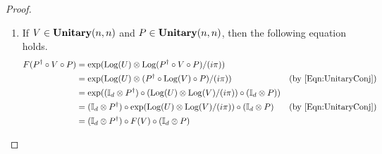 \begin{proof}
\begin{enumerate}
\begin{align*}
              \\
              &=
              \exp( \Log( U ) \otimes \Log( U ) \otimes H / (i\pi)^2 )
              &
              ( \text{by Thm.~\ref{Thm:ControlAssoc}} )
              \\
              &=
              \exp( ( \sigma_{d,d} \cdot ( \Log( U ) \otimes \Log( U ) ) \cdot \sigma_{d,d} ) \otimes H / (i\pi)^2 )
              \\
              &=
              \exp( ( \sigma_{d,d} \otimes \mathbb{I}_n ) \cdot ( \Log( U ) \otimes \Log( U ) \otimes H / (i\pi)^2 ) \cdot ( \sigma_{d,d} \otimes \mathbb{I}_n ) )
              \\
              &=
              ( \sigma_{d,d} \otimes \mathbb{I}_n ) \cdot \exp( \Log( U ) \otimes \Log( U ) \otimes H / (i\pi)^2 ) \cdot ( \sigma_{d,d} \otimes \mathbb{I}_n )
              &
              ( \text{by~\cref{Eqn:UnitaryConj}} )
              \\
              &=
              ( \sigma_{d,d} \otimes \mathbb{I}_n ) \cdot ( U \odot ( U \odot V ) ) \cdot ( \sigma_{d,d} \otimes \mathbb{I}_n )
              &
              ( \text{by Thm.~\ref{Thm:ControlAssoc}} )
              \\
              &=
              ( \sigma_{d,d} \otimes \mathbb{I}_n ) \cdot F( F( V ) ) \cdot ( \sigma_{d,d} \otimes \mathbb{I}_n )
          \end{align*}
          Then $F( F( V ) ) = ( \sigma_{d,d} \otimes \mathbb{I}_n ) \cdot F( F( V ) ) \cdot ( \sigma_{d,d} \otimes \mathbb{I}_n )$.
          Since $\sigma_{d,d} \otimes \mathbb{I}_n$ is also self-adjoint, then $( \sigma_{d,d} \otimes \mathbb{I}_n ) \cdot F( F( V ) ) = F( F( V ) ) \cdot ( \sigma_{d,d} \otimes \mathbb{I}_n )$.
    \item If $V \in \mathbf{Unitary}( n, n )$ and $P \in \mathbf{Unitary}( n, n )$, then the following equation holds.
          \begin{align*}
              F( P^\dagger \circ V \circ P )
              &=
              \exp( \Log( U ) \otimes \Log( P^\dagger \circ V \circ P ) / (i\pi) )
              \\
              &=
              \exp( \Log( U ) \otimes ( P^\dagger \circ \Log( V ) \circ P ) / (i\pi) )
              &
              ( \text{by~\cref{Eqn:UnitaryConj}} )
              \\
              &=
              \exp( ( \mathbb{I}_d \otimes P^\dagger ) \circ ( \Log( U ) \otimes \Log( V ) / (i\pi) ) \circ ( \mathbb{I}_d \otimes P ) )
              \\
              &=
              ( \mathbb{I}_d \otimes P^\dagger ) \circ \exp( \Log( U ) \otimes \Log( V ) / (i\pi) ) \circ ( \mathbb{I}_d \otimes P )
              &
              ( \text{by~\cref{Eqn:UnitaryConj}} )
              \\
              &=
              ( \mathbb{I}_d \otimes P^\dagger ) \circ F( V ) \circ ( \mathbb{I}_d \otimes P )
          \end{align*}
    \end{enumerate}


\end{proof}
